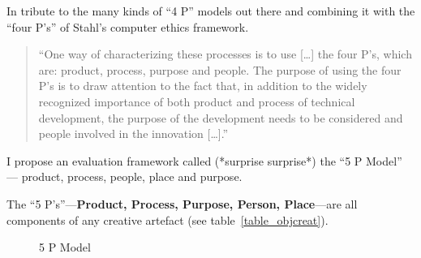 In tribute to the many kinds of ``4 P'' models out there and combining it with the ``four P's'' of Stahl's computer ethics framework.

\begin{quote}
  ``One way of characterizing these processes is to use [\ldots] the four P's, which are: product, process, purpose and people. The purpose of using the four P's is to draw attention to the fact that, in addition to the widely recognized importance of both product and process of technical development, the purpose of the development needs to be considered and people involved in the innovation [\ldots].'' 
\end{quote}

I propose an evaluation framework called (*surprise surprise*) the ``5 P Model'' --- product, process, people, place and purpose.



The ``5 P's''---\textbf{Product, Process, Purpose, Person, Place}---are all components of any creative artefact (see table~\ref{table_objcreat}).

\begin{figure}[htb] %
  \centering
  \tikzset{every fit/.append style=text badly centered}
\caption[5 P Model]{5 P Model}
\label{fig:5PModel}
\end{figure}


